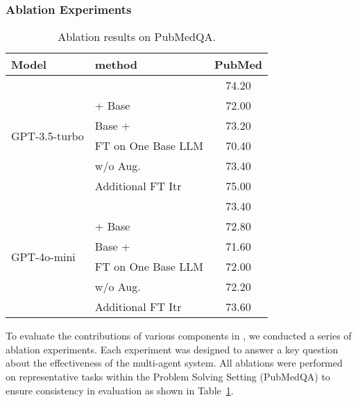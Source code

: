 \subsubsection{Ablation Experiments}
\begin{table}[t]
\caption{Ablation results on PubMedQA.}
\centering
\small
\label{tab:problem-solving-ablation}
\begin{tabular}{l|l|c}
\toprule
Model                          & method                & PubMed  \\
\midrule
\multirow{6}{*}{GPT-3.5-turbo} & \model{}                 & 74.20 \\
                               & \model{} + Base          & 72.00 \\
                               & Base + \model{}          & 73.20 \\
                               & FT on One Base LLM       & 70.40 \\
                               & \model{} w/o Aug.        & 73.40 \\
                               & Additional FT Itr        & 75.00      \\
\midrule
\multirow{6}{*}{GPT-4o-mini}   & \model{}                 &73.40      \\
                               & \model{} + Base          & 72.80   \\
                               & Base + \model{}          & 71.60   \\
                               & FT on One Base LLM       & 72.00   \\
                               & \model{} w/o Aug.        & 72.20    \\
                               & Additional FT Itr        & 73.60        \\
\bottomrule                       
\end{tabular}
\end{table}
To evaluate the contributions of various components in \model{}, we conducted a series of ablation experiments.  Each experiment was designed to answer a key question about the effectiveness of the multi-agent system. All ablations were performed on representative tasks within the Problem Solving Setting (PubMedQA) to ensure consistency in evaluation as shown in Table~\ref{tab:problem-solving-ablation}.

